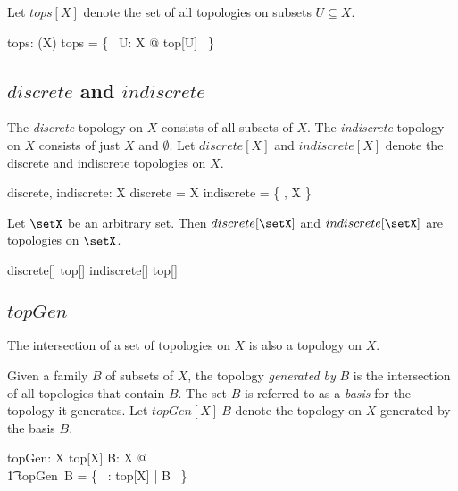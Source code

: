 \documentclass{amsart}
\begin{document}
Let $tops[X]$ denote the set of all topologies on subsets $U \subseteq X$.

\begin{gendef}[X]
	tops: \power(\Fam X)
\where
	tops = \bigcup \{~ U: \power X @ top[U] ~\}
\end{gendef}

\subsection{$discrete$ and $indiscrete$}

The {\it discrete} topology on $X$ consists of all subsets of $X$.
The {\it indiscrete} topology on $X$ consists of just $X$ and $\emptyset$.
Let $discrete[X]$ and $indiscrete[X]$ denote the discrete and indiscrete topologies on $X$.

\begin{gendef}[X]
	discrete, indiscrete: \Fam X
\where
	discrete = \power X
\also
	indiscrete =  \{ \emptyset, X \}
\end{gendef}

\begin{example}
Let $\setX$ be an arbitrary set.
Then $discrete[\setX]$ and $indiscrete[\setX]$ are topologies on $\setX$.

\begin{zed}
	discrete[\setX] \in top[\setX] 
\also
	indiscrete[\setX] \in top[\setX]
\end{zed}

\end{example}

\subsection{$topGen$}

\begin{remark}

The intersection of a set of topologies on $X$ is also a topology on $X$.

\end{remark}

Given a family $B$ of subsets of $X$, the topology {\it generated by} $B$ is the intersection of all
topologies that contain $B$.
The set $B$ is referred to as a {\it basis} for the topology it generates.
Let $topGen[X]~B$ denote the topology on $X$ generated by the basis $B$.

\begin{gendef}[X]
	topGen: \Fam X \fun top[X]
\where
	\forall B: \Fam X @ \\
	\t1	topGen~B = \bigcap \{~ \tau: top[X] | B \subseteq \tau ~\}
\end{gendef}
\end{document}
